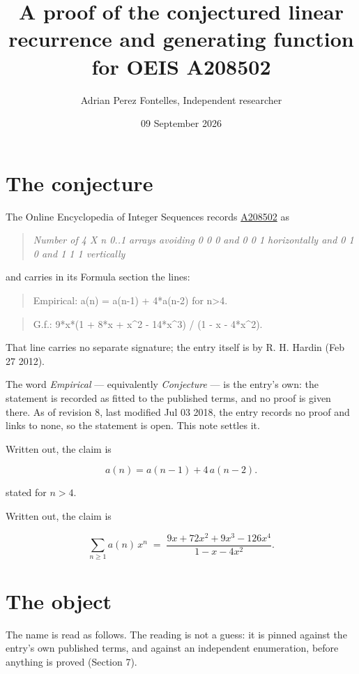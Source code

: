 \documentclass[11pt]{article}
\title{A proof of the conjectured linear recurrence and generating function for OEIS A208502}
\author{Adrian Perez Fontelles, Independent researcher}
\date{09 September 2026}
\theoremstyle{definition}
\begin{document}
\maketitle
\section{The conjecture}

The Online Encyclopedia of Integer Sequences records \href{https://oeis.org/A208502}{A208502} as

\begin{quote}\itshape Number of 4 X n 0..1 arrays avoiding 0 0 0 and 0 0 1 horizontally and 0 1 0 and 1 1 1 vertically\end{quote}

and carries in its Formula section the lines:

\begin{quote}\ttfamily Empirical: a(n) = a(n-1) + 4*a(n-2) for n>4.\end{quote}

\begin{quote}\ttfamily G.f.: 9*x*(1 + 8*x + x\textasciicircum{}2 - 14*x\textasciicircum{}3) / (1 - x - 4*x\textasciicircum{}2).\end{quote}

That line carries no separate signature; the entry itself is by R. H. Hardin (Feb 27 2012).

The word {\itshape Empirical} --- equivalently {\itshape Conjecture} --- is the entry's own: the statement is recorded as fitted to the published terms, and no proof is given there. As of revision 8, last modified Jul 03 2018, the entry records no proof and links to none, so the statement is open. This note settles it.

Written out, the claim is

\[a(n) = a(n-1) + 4\,a(n-2).\]

stated for $n > 4$.

Written out, the claim is

\[\sum_{n \ge 1} a(n)\,x^n \;=\; \frac{9x + 72x^{2} + 9x^{3} - 126x^{4}}{1 - x - 4x^{2}}.\]

\section{The object}

The name is read as follows. The reading is not a guess: it is pinned against the entry's own published terms, and against an independent enumeration, before anything is proved (Section 7).
\end{document}
